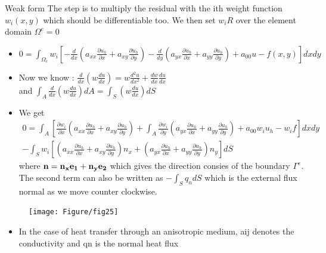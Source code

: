	\begin{frame}{Weak form}
		The step is to multiply the residual with the ith weight function $w_i(x,y)$ which should be differentiable too. We then set $w_iR$ over the element domain $\Omega^e = 0$
		\begin{itemize}
			\item $0 = \int_{\Omega_e} w_i \left[ 
			-\frac{d}{dx}\left(a_{xx} \frac{\partial u_h}{\partial x} + a_{xy} \frac{\partial u_h}{\partial y} \right)
			-\frac{d}{dy}\left(a_{yx} \frac{\partial u_h}{\partial x} + a_{yy} \frac{\partial u_h}{\partial y} \right) + a_{00} u - f(x,y) \right] dxdy$
			\item Now we know : $\frac{d}{dx}\left(w \frac{du}{dx}\right) = w\frac{d^2u}{dx^2} + \frac{dw}{dx}\frac{du}{dx}$ \\ and $\int_A \frac{d}{dx}\left(w \frac{du}{dx} \right) dA= \int_S \left(w \frac{du}{dx} \right) dS$
			\item We get 
			\begin{equation}
			\begin{aligned}
			0 = \int_A \left[\frac{\partial w_i}{\partial x} \left(a_{xx} \frac{\partial u_h}{\partial x } + a_{xy} \frac{\partial u_h}{\partial y }\right) + 
			\int_A \frac{\partial w_i}{\partial y} \left(a_{yx} \frac{\partial u_h}{\partial x } + a_{yy} \frac{\partial u_h}{\partial y }\right) + a_{00}w_iu_h - w_if \right]dxdy \\
			- \int_S w_i \left[ \left(a_{xx} \frac{\partial u_h}{\partial x} + a_{xy} \frac{\partial u_h}{\partial y} \right)n_x + \left(a_{yx} \frac{\partial u_h}{\partial x} + a_{yy} \frac{\partial u_h}{\partial y} \right)n_y \right]dS
			\end{aligned}
			\end{equation}
			where $\mathbf{n = n_xe_1 + n_ye_2}$ which gives the direction consies of the boundary $\Gamma^e$. The second term can also be written as $-\int_S q_n dS$ which is the external flux normal as we move counter clockwise. 
		\end{itemize}
	\end{frame}


	\begin{frame}
		\begin{figure}
			\centering
			\texttt{[image: Figure/fig25]} 		
		\end{figure}
	\begin{itemize}
		\item In the case of heat transfer through an anisotropic medium, aij denotes the conductivity and qn is the normal heat flux
		
	\end{itemize}
	\end{frame}


